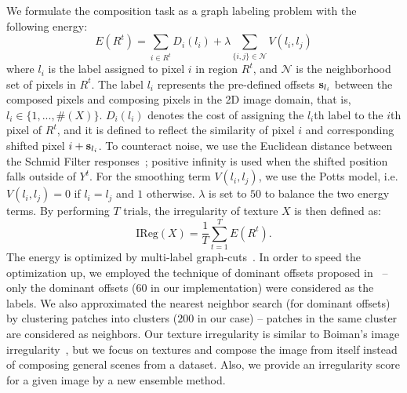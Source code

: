 \documentclass[10pt,twocolumn,letterpaper]{article}
\begin{document}
We formulate the composition task
as a graph labeling problem with the following energy: 
\begin{equation}
  \label{eq:regu:energy}
  E(R^t) = \sum_{i\in R^t}D_i(l_i) + \lambda \sum_{\{i,j\} \in \mathcal{N}}V(l_i, l_j)
\end{equation}
where $l_i$ is the label assigned to pixel $i$ in region $R^t$, and
$\mathcal{N}$ is the neighborhood set of pixels in $R^t$. The label
$l_i$ represents the pre-defined offsets $\bold{s}_{l_i}$ between the
composed pixels and composing pixels in the 2D image domain, that is,
$l_i \in \{1, ..., \#(X)\}$.  $D_i(l_i)$ denotes the cost of assigning
the $l_i$th label to the $i$th pixel of $R^t$, and it is defined to
reflect the similarity of pixel $i$ and corresponding shifted pixel
$i+\bold{s}_{l_i}$. To counteract noise, we use the Euclidean distance
between the Schmid Filter responses~\cite{Schmid01}; positive infinity
is used when the shifted position falls outside of $Y^t$. For the
smoothing term $V(l_i, l_j)$, we use the Potts model, i.e. $V(l_i,l_j)
= 0$ if $l_i = l_j$ and $1$ otherwise. $\lambda$ is set to $50$ to
balance the two energy terms.  By performing $T$ trials, the
irregularity of texture $X$ is then defined as:
\begin{equation}
  \label{eq:regularity}
  \text{IReg}(X) = \frac{1}{T} \sum_{t=1}^{T}E(R^t). 
\end{equation}
The energy is optimized by multi-label graph-cuts~\cite{graphcut}.  In
order to speed the optimization up, we employed the technique of
dominant offsets proposed in~\cite{He:completion:eccv12} -- only the
dominant offsets ($60$ in our implementation) were considered as the
labels. We also approximated the nearest neighbor search (for
dominant offsets) by clustering patches into clusters ($200$ in our
case) -- patches in the same cluster are considered as neighbors. Our
texture irregularity is similar to Boiman's image
irregularity~\cite{Boiman:07}, but we focus on textures and
compose the image from itself instead of composing general scenes from a
dataset. Also, we provide an irregularity score for a given image by a
new ensemble method.
\end{document}
